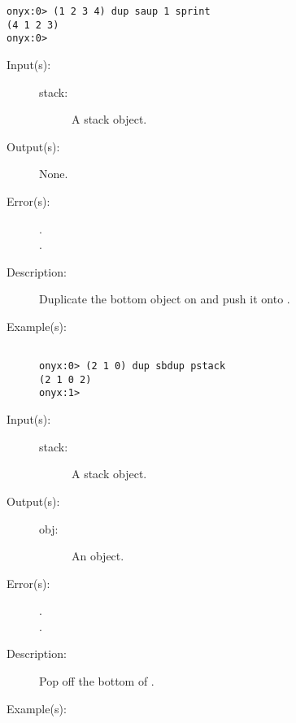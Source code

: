 \begin{description}
\begin{description}
\begin{verbatim}
onyx:0> (1 2 3 4) dup saup 1 sprint
(4 1 2 3)
onyx:0>
		\end{verbatim}
	\end{description}
\label{systemdict:sbdup}
\item[{\onyxop{stack}{sbdup}{--}}: ]
	\begin{description}\item[]
	\item[Input(s): ]
		\begin{description}\item[]
		\item[stack: ]
			A stack object.
		\end{description}
	\item[Output(s): ] None.
	\item[Error(s): ]
		\begin{description}\item[]
		\item[.]
		\item[.]
		\end{description}
	\item[Description: ]
		Duplicate the bottom object on  and push it onto
		.
	\item[Example(s): ]\begin{verbatim}

onyx:0> (2 1 0) dup sbdup pstack
(2 1 0 2)
onyx:1>
		\end{verbatim}
	\end{description}
\label{systemdict:sbpop}
\item[{\onyxop{stack}{sbpop}{obj}}: ]
	\begin{description}\item[]
	\item[Input(s): ]
		\begin{description}\item[]
		\item[stack: ]
			A stack object.
		\end{description}
	\item[Output(s): ]
		\begin{description}\item[]
		\item[obj: ]
			An object.
		\end{description}
	\item[Error(s): ]
		\begin{description}\item[]
		\item[.]
		\item[.]
		\end{description}
	\item[Description: ]
		Pop  off the bottom of .
	\item[Example(s): ]\begin{verbatim}


\end{verbatim}
\end{description}
\end{description}
